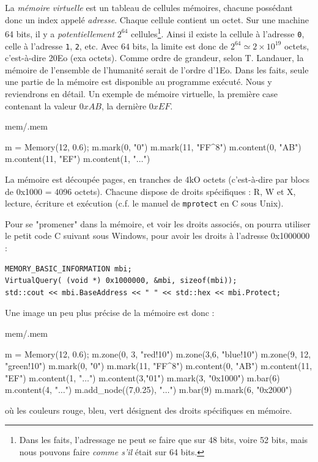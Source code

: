 \documentclass{book}
\newcounter{Qcours}
\newenvironment{memory}{%
	\noindent
	\VerbatimEnvironment\stepcounter{Qcours}%
	\begin{VerbatimOut}{mem/\theQcours.mem}%
	}{\end{VerbatimOut}%
}
\newcommand{\C}{\textsc{C}\xspace}
\newcommand{\code}[1]{\texttt{#1}}
\begin{document}
La \emph{mémoire virtuelle} est un tableau de cellules mémoires, chacune possédant donc un index appelé \emph{adresse}. Chaque cellule contient un octet. Sur une machine 64 bits, il y a \emph{potentiellement} $2^{64}$ cellules\footnote{Dans les faits,  l'adressage ne peut se faire que sur 48 bits, voire 52 bits, mais nous pouvons faire \emph{comme s'il} était sur 64 bits.}. Ainsi il existe la cellule à l'adresse \code{0}, celle à l'adresse \code{1}, \code{2}, etc. Avec $64$ bits, la limite est donc de $2^{64} \simeq 2 \times 10^{19}$ octets, c'est-à-dire 20Eo (exa octets). Comme ordre de grandeur, selon T. Landauer, la mémoire de l'ensemble de l'humanité serait de l'ordre d'1Eo. Dans les faits, seule une partie de la mémoire est disponible au programme exécuté. Nous y reviendrons en détail.  Un exemple de mémoire virtuelle, la première case contenant la valeur $0xAB$, la dernière $0xEF$. 

\medskip
\begin{memory}
m = Memory(12, 0.6);
m.mark(0, "0")
m.mark(11, "FF\^ {}8")
m.content(0, "AB")
m.content(11, "EF")
m.content(1, "$\ldots$")
\end{memory}

La mémoire est découpée pages, en tranches de 4kO octets (c'est-à-dire par blocs de 0x1000 = 4096 octets). Chacune dispose de droits spécifiques : R, W et X, lecture, écriture et exécution (c.f. le manuel de {\tt mprotect} en \C sous Unix). 

Pour se "promener" dans la mémoire, et voir les droits associés, on pourra utiliser le petit code \C suivant sous Windows, pour avoir les droits à l'adresse 0x1000000 :
\begin{verbatim}
MEMORY_BASIC_INFORMATION mbi;
VirtualQuery( (void *) 0x1000000, &mbi, sizeof(mbi));
std::cout << mbi.BaseAddress << " " << std::hex << mbi.Protect;
\end{verbatim}

Une image un peu plus précise de la mémoire est donc :

\medskip
\begin{memory}
m = Memory(12, 0.6);
m.zone(0, 3, "red!10")
m.zone(3,6, "blue!10")
m.zone(9, 12, "green!10")
m.mark(0, "0")
m.mark(11, "FF\^ {}8")
m.content(0, "AB")
m.content(11, "EF")
m.content(1, "$\ldots$")
m.content(3,"01")
m.mark(3, "0x1000")
m.bar(6)
m.content(4, "$\ldots$")
m.add_node((7,0.25), "$\ldots$")
m.bar(9)
m.mark(6, "0x2000")
\end{memory}
où les couleurs rouge, bleu, vert désignent des droits spécifiques en mémoire. 
\end{document}
